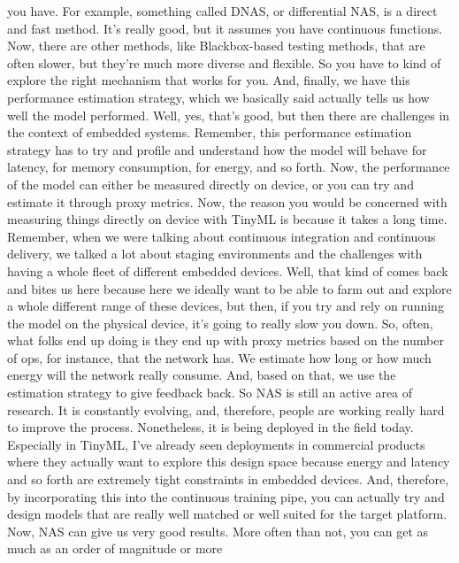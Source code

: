 {{{{    you have.
    For example, something called DNAS, or differential NAS,
    is a direct and fast method.
    It's really good, but it assumes you have continuous functions.
    Now, there are other methods, like Blackbox-based testing
    methods, that are often slower, but they're much more diverse and flexible.
    So you have to kind of explore the right mechanism that works for you.
    And, finally, we have this performance estimation strategy,
    which we basically said actually tells us how well the model performed.
    Well, yes, that's good, but then there are challenges
    in the context of embedded systems.
    Remember, this performance estimation strategy
    has to try and profile and understand how
    the model will behave for latency, for memory consumption, for energy,
    and so forth.
    Now, the performance of the model can either be measured directly on device,
    or you can try and estimate it through proxy metrics.
    Now, the reason you would be concerned with measuring things directly
    on device with TinyML is because it takes a long time.
    Remember, when we were talking about continuous integration
    and continuous delivery, we talked a lot about staging environments
    and the challenges with having a whole fleet of different embedded devices.
    Well, that kind of comes back and bites us here
    because here we ideally want to be able to farm out and explore
    a whole different range of these devices,
    but then, if you try and rely on running the model on the physical device,
    it's going to really slow you down.
    So, often, what folks end up doing is they
    end up with proxy metrics based on the number of ops,
    for instance, that the network has.
    We estimate how long or how much energy will the network really consume.
    And, based on that, we use the estimation strategy
    to give feedback back.
    So NAS is still an active area of research.
    It is constantly evolving, and, therefore,
    people are working really hard to improve the process.
    Nonetheless, it is being deployed in the field today.
    Especially in TinyML, I've already seen deployments in commercial products
    where they actually want to explore this design space because energy and latency
    and so forth are extremely tight constraints in embedded devices.
    And, therefore, by incorporating this into the continuous training pipe,
    you can actually try and design models that are really well matched or well
    suited for the target platform.
    Now, NAS can give us very good results.
    More often than not, you can get as much as an order of magnitude or more
}}}}

